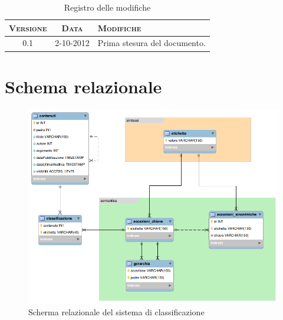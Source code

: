 \documentclass[10pt,a4paper,headinclude,footinclude,hidelinks]{scrreprt} %
\begin{document}
    \title{\rmfamily\normalfont{}}
    \author{}
    \date{\today}
    
    \maketitle
    
    \begin{abstract}
        \noindent Il documento presenta il modello relazionale per l'integrazione dei nuovi criteri di classificazione nella piattaforma.
    \end{abstract}
    
	\begin{table}[ht]
	\centering
	\begin{tabular}{|c|c|l|}
	\hline
	\textsc{Versione} & \textsc{Data} & \textsc{Modifiche} \\ \hline
	0.1 & 2-10-2012 & Prima stesura del documento. \\ \hline
	\end{tabular}
	\caption{Registro delle modifiche}
	\label{tab:stage:wp:workload}
	\end{table}

	\tableofcontents

	\chapter{Schema relazionale}
	\label{ch:stage:er:schema}

	\begin{figure}[ht]
		\begin{center}
	    	\includegraphics[width=14cm]{modello-er.png}
			\caption{Scherma relazionale del sistema di classificazione}
		\end{center}
	\end{figure}
 
\end{document}
